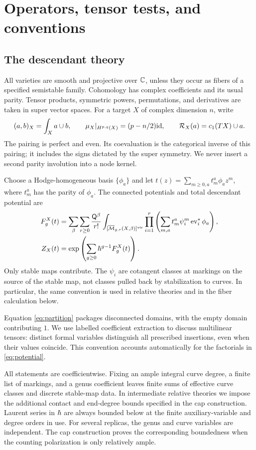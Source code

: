 \section{Operators, tensor tests, and conventions}\label{sec:conventions}

\subsection{The descendant theory}

All varieties are smooth and projective over \(\mathbb C\), unless they occur as fibers of a specified semistable family. Cohomology has complex coefficients and its usual parity. Tensor products, symmetric powers, permutations, and derivatives are taken in super vector spaces. For a target \(X\) of complex dimension \(n\), write
\[
 (a,b)_X=\int_X a\cup b,\qquad
 \mu_X|_{H^{p,q}(X)}=(p-n/2)\mathrm{id},\qquad
 \mathcal R_X(a)=c_1(TX)\cup a.
\]
The pairing is perfect and even. Its coevaluation is the categorical inverse of this pairing; it includes the signs dictated by the super symmetry. We never insert a second parity involution into a node kernel.

Choose a Hodge-homogeneous basis \(\{\phi_a\}\) and let
\(t(z)=\sum_{m\geq0,a}t_m^a\phi_a z^m\), where \(t_m^a\) has the parity of \(\phi_a\). The connected potentials and total descendant potential are
\begin{align}
 F_g^X(t)
 &=\sum_{\beta}\sum_{r\geq0}
   \frac{\mathsf Q^\beta}{r!}
   \int_{[\overline{\mathcal M}_{g,r}(X,\beta)]^{\mathrm{vir}}}
        \prod_{i=1}^r\left(\sum_{m,a}t_m^a\psi_i^m\operatorname{ev}_i^*\phi_a\right),
 \label{eq:potential}\\
 Z_X(t)&=\exp\left(\sum_{g\geq0}\hbar^{g-1}F_g^X(t)\right).
 \label{eq:partition}
\end{align}
Only stable maps contribute. The \(\psi_i\) are cotangent classes at markings on the source of the stable map, not classes pulled back by stabilization to curves. In particular, the same convention is used in relative theories and in the fiber calculation below.

Equation \eqref{eq:partition} packages disconnected domains, with the empty domain contributing \(1\). We use labelled coefficient extraction to discuss multilinear tensors: distinct formal variables distinguish all prescribed insertions, even when their values coincide. This convention accounts automatically for the factorials in \eqref{eq:potential}.

All statements are coefficientwise. Fixing an ample integral curve degree, a finite list of markings, and a genus coefficient leaves finite sums of effective curve classes and discrete stable-map data. In intermediate relative theories we impose the additional contact and end-degree bounds specified in the cap construction. Laurent series in \(\hbar\) are always bounded below at the finite auxiliary-variable and degree orders in use. For several replicas, the genus and curve variables are independent. The cap construction proves the corresponding boundedness when the counting polarization is only relatively ample.

